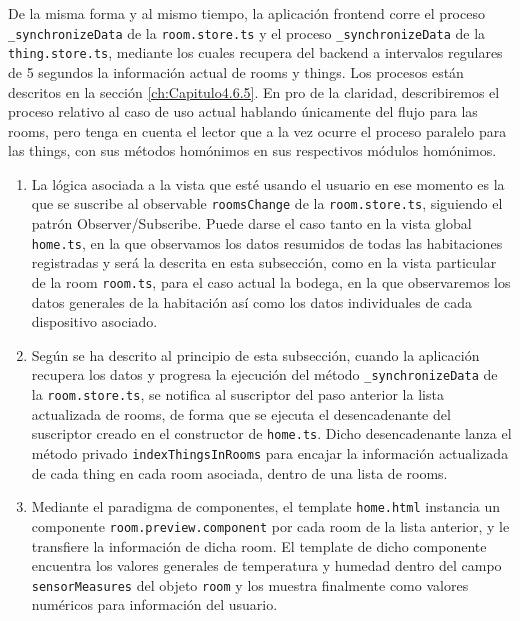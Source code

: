 \vspace{1cm}

De la misma forma y al mismo tiempo, la aplicación frontend corre el proceso \verb|_synchronizeData| de la \verb|room.store.ts| y el proceso \verb|_synchronizeData| de la \verb|thing.store.ts|, mediante los cuales recupera del backend a intervalos regulares de 5 segundos la información actual de rooms y things. Los procesos están descritos en la sección \ref{ch:Capitulo4.6.5}. En pro de la claridad, describiremos el proceso relativo al caso de uso actual hablando únicamente del flujo para las rooms, pero tenga en cuenta el lector que a la vez ocurre el proceso paralelo para las things, con sus métodos homónimos en sus respectivos módulos homónimos.

\begin{enumerate}
\item La lógica asociada a la vista que esté usando el usuario en ese momento es la que se suscribe al observable \verb|roomsChange| de la \verb|room.store.ts|, siguiendo el patrón Observer/Subscribe. Puede darse el caso tanto en la vista global \verb|home.ts|, en la que observamos los datos resumidos de todas las habitaciones registradas y será la descrita en esta subsección, como en la vista particular de la room \verb|room.ts|, para el caso actual la bodega, en la que observaremos los datos generales de la habitación así como los datos individuales de cada dispositivo asociado.
\item Según se ha descrito al principio de esta subsección, cuando la aplicación recupera los datos y progresa la ejecución del método \verb|_synchronizeData| de la \verb|room.store.ts|, se notifica al suscriptor del paso anterior la lista actualizada de rooms, de forma que se ejecuta el desencadenante del suscriptor creado en el constructor de \verb|home.ts|. Dicho desencadenante lanza el método privado \verb|indexThingsInRooms| para encajar la información actualizada de cada thing en cada room asociada, dentro de una lista de rooms.
\item Mediante el paradigma de componentes, el template \verb|home.html| instancia un componente \verb|room.preview.component| por cada room de la lista anterior, y le transfiere la información de dicha room. El template de dicho componente encuentra los valores generales de temperatura y humedad dentro del campo \verb|sensorMeasures| del objeto \verb|room| y los muestra finalmente como valores numéricos para información del usuario.
\end{enumerate}